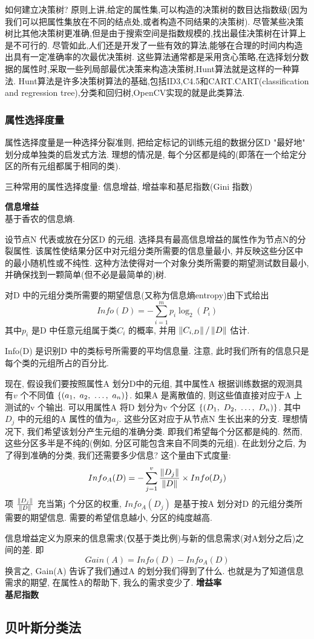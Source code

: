 \documentclass{article}
\begin{document}
如何建立决策树?
原则上讲,给定的属性集,可以构造的决策树的数目达指数级(因为我们可以把属性集放在不同的结点处,或者构造不同结果的决策树).
尽管某些决策树比其他决策树更准确,但是由于搜索空间是指数规模的,找出最佳决策树在计算上是不可行的.
尽管如此,人们还是开发了一些有效的算法,能够在合理的时间内构造出具有一定准确率的次最优决策树.
这些算法通常都是采用贪心策略,在选择划分数据的属性时,采取一些列局部最优决策来构造决策树,Hunt算法就是这样的一种算法.
Hunt算法是许多决策树算法的基础,包括ID3,C4.5和CART.CART(classification and regression tree),分类和回归树,OpenCV实现的就是此类算法.

\subsubsection{属性选择度量}
属性选择度量是一种选择分裂准则, 把给定标记的训练元组的数据分区D "最好地" 划分成单独类的启发式方法. 理想的情况是, 每个分区都是纯的(即落在一个给定分区的所有元组都属于相同的类).

三种常用的属性选择度量: 信息增益, 增益率和基尼指数(Gini 指数)

\textbf{信息增益}\\
基于香农的信息熵.

设节点N 代表或放在分区D 的元组. 选择具有最高信息增益的属性作为节点N的分裂属性. 该属性使结果分区中对元组分类所需要的信息量最小, 并反映这些分区中的最小随机性或不纯性.
这种方法使得对一个对象分类所需要的期望测试数目最小, 并确保找到一颗简单(但不必是最简单的)树.

对D 中的元组分类所需要的期望信息(又称为信息熵entropy)由下式给出
$$
Info(D) = - \sum_{i = 1}^m p_i \log_2 (P_i)
$$
其中$p_i$ 是D 中任意元组属于类$C_i$ 的概率, 并用 $\left\Vert C_{i,D}\right\Vert / \left\Vert D\right\Vert$ 估计.\par
Info(D) 是识别D 中的类标号所需要的平均信息量. 注意, 此时我们所有的信息只是每个类的元组所占的百分比.

现在, 假设我们要按照属性A 划分D中的元组, 其中属性A 根据训练数据的观测具有$v$ 个不同值
$\{ (a_1,~a_2,~\ldots,~a_n) \}$. 
如果A 是离散值的, 则这些值直接对应于A 上测试的v 个输出.
可以用属性A 将D 划分为v 个分区
$\{ (D_1,~D_2,~\ldots,~D_n) \}$. 
其中$D_j$ 中的元组的A 属性的值为$a_j$. 这些分区对应于从节点N 生长出来的分支. 理想情况下, 我们希望该划分产生元组的准确分类. 即我们希望每个分区都是纯的.
然而, 这些分区多半是不纯的(例如, 分区可能包含来自不同类的元组). 在此划分之后, 为了得到准确的分类, 我们还需要多少信息? 这个量由下式度量:
$$
Info_A(D) = - \sum_{j = 1}^v \frac{\left\Vert D_j\right\Vert}{\left\Vert D\right\Vert} \times Info(D_j)
$$
项 $\frac{\left\Vert D_j\right\Vert}{\left\Vert D\right\Vert}$ 充当第j 个分区的权重, $Info_A(D_j)$ 是基于按A 划分对D 的元组分类所需要的期望信息. 需要的希望信息越小, 分区的纯度越高.

信息增益定义为原来的信息需求(仅基于类比例)与新的信息需求(对A划分之后)之间的差. 即
$$
Gain(A) = Info(D) - Info_A(D)
$$
换言之, Gain(A) 告诉了我们通过A 的划分我们得到了什么. 也就是为了知道信息需求的期望, 在属性A的帮助下, 我么的需求变少了.
\textbf{增益率}\\
\textbf{基尼指数}\\

\subsection{贝叶斯分类法}
\end{document}
